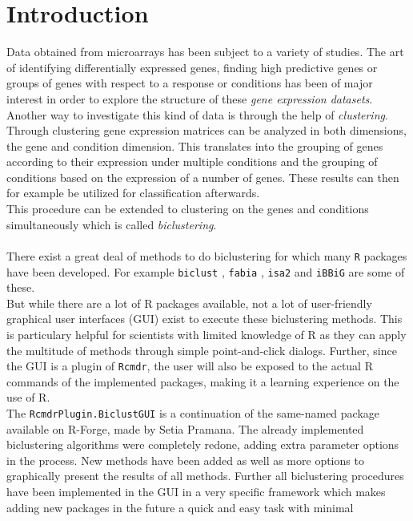 \documentclass[a4paper]{article}\usepackage[]{graphicx}\usepackage[]{color}
\begin{document}
\section{Introduction} 
Data obtained from microarrays has been subject to a variety of studies. The art
of identifying differentially expressed genes, finding high predictive genes or
groups of genes with respect to a response or conditions has been of
major interest in order to explore the structure of these {\it gene expression
datasets}. \\
Another way to investigate this kind of data is through the help of {\it
clustering}. Through clustering gene expression matrices can be analyzed in both
dimensions, the gene and condition dimension. This translates into the grouping
of genes according to their expression under multiple conditions and the
grouping of conditions based on the expression of a number of genes. These
results can then for example be utilized for classification afterwards. \\
This procedure can be extended to clustering on the genes and conditions
simultaneously which is called {\it biclustering}. 
\\ \\
There exist a great deal of methods to do biclustering for which many \verb|R|
packages have been developed. For example \verb|biclust| \citep{Kaiser2008},
\verb|fabia| \citep{Hochreiter2010}, \verb|isa2| \citep{Csardi2014} and
\verb|iBBiG| \citep{Gustenleitner2012} are some of these.\\
But while there are a lot of R packages available, not a lot of user-friendly
graphical user interfaces (GUI) exist to execute these biclustering methods.
This is particulary helpful for scientists with limited knowledge of R as they can apply the multitude of
methods through simple point-and-click dialogs. Further, since the GUI is a
plugin of \verb|Rcmdr|, the user will also be exposed to the actual R
commands of the implemented packages, making it a learning experience on
the use of R.\\
The \verb|RcmdrPlugin.BiclustGUI| is a continuation of the same-named package
available on R-Forge, made by Setia Pramana. The already implemented
biclustering algorithms were completely redone, adding extra parameter options
in the process. New methods have been added as well as more options to
graphically present the results of all methods. Further all biclustering
procedures have been implemented in the GUI in a very specific framework which
makes adding new packages in the future a quick and easy task with minimal
\end{document}
